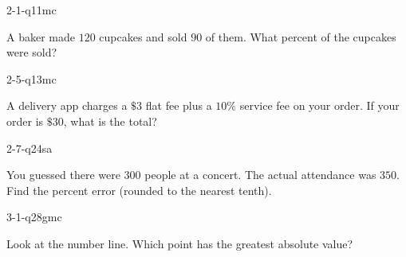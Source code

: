 \documentclass[12pt, fleqn, openany]{studyGuide}
\begin{document}
\begin{practiceQuestion}{2-1-q11}{mc}
\begin{questionText}
A baker made $120$ cupcakes and sold $90$ of them. What percent of the cupcakes were sold?
\end{questionText}
\end{practiceQuestion}

\begin{practiceQuestion}{2-5-q13}{mc}
\begin{questionText}
A delivery app charges a $\$3$ flat fee plus a $10\%$ service fee on your order. If your order is $\$30$, what is the total?


\end{questionText}
\end{practiceQuestion}

\begin{practiceQuestion}{2-7-q24}{sa}
\begin{questionText}
You guessed there were $300$ people at a concert. The actual attendance was $350$. Find the percent error (rounded to the nearest tenth).
\end{questionText}
\end{practiceQuestion}

\begin{practiceQuestion}{3-1-q28}{gmc}
\begin{questionText}
Look at the number line. Which point has the greatest absolute value?

\begin{center}
\end{center}
\end{questionText}
\end{practiceQuestion}
\end{document}
